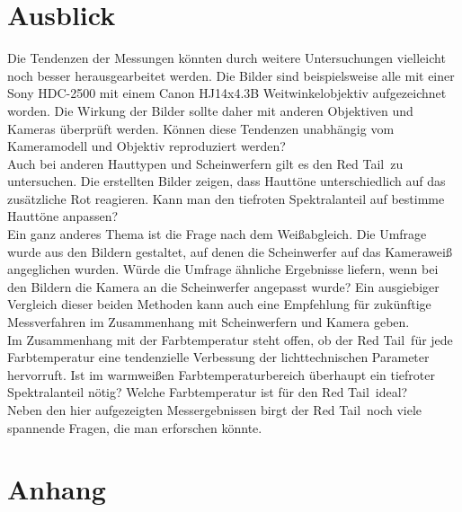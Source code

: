  


\chapter{Ausblick}
Die Tendenzen der Messungen könnten durch weitere Untersuchungen vielleicht noch besser herausgearbeitet werden.
Die Bilder sind beispielsweise alle mit einer Sony HDC-2500  mit einem Canon HJ14x4.3B Weitwinkelobjektiv aufgezeichnet worden. Die Wirkung der Bilder sollte daher mit anderen Objektiven und Kameras überprüft werden. Können diese Tendenzen unabhängig vom Kameramodell und Objektiv reproduziert werden?\\
Auch bei anderen Hauttypen und Scheinwerfern gilt es den \glqq Red Tail\grqq\ zu untersuchen. Die erstellten Bilder zeigen, dass Hauttöne unterschiedlich auf das zusätzliche Rot reagieren. Kann man den tiefroten Spektralanteil auf bestimme Hauttöne anpassen? \\
Ein ganz anderes Thema ist die Frage nach dem Weißabgleich. Die Umfrage wurde aus den Bildern gestaltet, auf denen die Scheinwerfer auf das Kameraweiß angeglichen wurden. Würde die Umfrage ähnliche Ergebnisse liefern, wenn bei den Bildern die Kamera an die Scheinwerfer angepasst wurde? Ein ausgiebiger Vergleich dieser beiden Methoden kann auch eine Empfehlung für zukünftige Messverfahren im Zusammenhang mit Scheinwerfern und Kamera geben.\\
Im Zusammenhang mit der Farbtemperatur steht offen, ob der \glqq Red Tail\grqq\ für jede Farbtemperatur eine tendenzielle Verbessung der lichttechnischen Parameter hervorruft. Ist im warmweißen Farbtemperaturbereich überhaupt ein tiefroter Spektralanteil nötig? Welche Farbtemperatur ist für den \glqq Red Tail\grqq\ ideal?\\
Neben den hier aufgezeigten Messergebnissen birgt der \glqq Red Tail\grqq\ noch viele spannende Fragen, die man erforschen könnte.   



\listoffigures %
\listoftables %


\chapter{Anhang}

